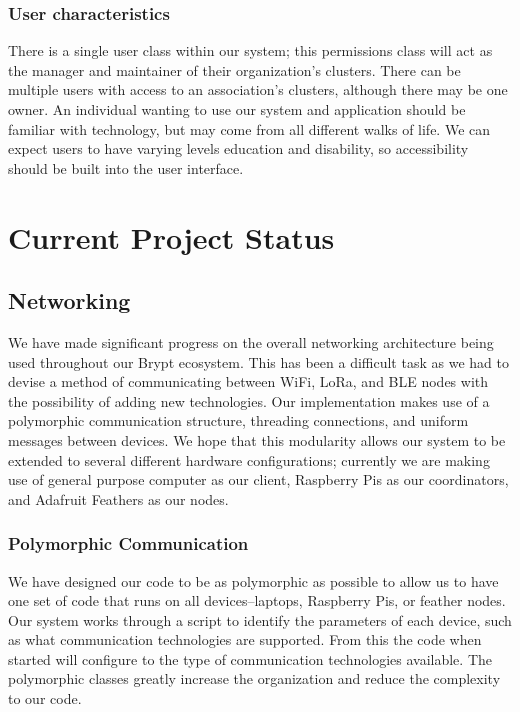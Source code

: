 \documentclass[tikz,a4paper,titlepage]{article}
\begin{document}
\subsubsection{User characteristics}
There is a single user class within our system; this permissions class will act as the manager and maintainer of their organization’s clusters. There can be multiple users with access to an association's clusters, although there may be one owner. An individual wanting to use our system and application should be familiar with technology, but may come from all different walks of life. We can expect users to have varying levels education and disability, so accessibility should be built into the user interface. 

\section{Current Project Status}

\subsection{Networking}
We have made significant progress on the overall networking architecture being used throughout our Brypt ecosystem. This has been a difficult task as we had to devise a method of communicating between WiFi, LoRa, and BLE nodes with the possibility of adding new technologies. Our implementation makes use of a polymorphic communication structure, threading connections, and uniform messages between devices. We hope that this modularity allows our system to be extended to several different hardware configurations; currently we are making use of general purpose computer as our client, Raspberry Pis as our coordinators, and Adafruit Feathers as our nodes.

\subsubsection{Polymorphic Communication}
We have designed our code to be as polymorphic as possible to allow us to have one set of code that runs on all devices--laptops, Raspberry Pis, or feather nodes. Our system works through a script to identify the parameters of each device, such as what communication technologies are supported. From this the code when started will configure to the type of communication technologies available. The polymorphic classes greatly increase the organization and reduce the complexity to our code.
\end{document}
